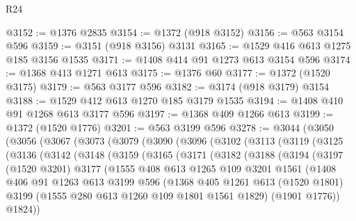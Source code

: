 \begin{lexlean}{R24}
\begin{coremodule}
@3152 := @1376 @2835
@3154 := @1372 (@918 @3152)
@3156 := @563 @3154 @596
@3159 := @3151 (@918 @3156) @3131
@3165 := @1529 @416 @613 @1275 @185 @3156 @1535
@3171 := @1408 @414 @91 @1273 @613 @3154 @596
@3174 := @1368 @413 @1271 @613
@3175 := @1376 @60
@3177 := @1372 (@1520 @3175)
@3179 := @563 @3177 @596
@3182 := @3174 (@918 @3179) @3154
@3188 := @1529 @412 @613 @1270 @185 @3179 @1535
@3194 := @1408 @410 @91 @1268 @613 @3177 @596
@3197 := @1368 @409 @1266 @613
@3199 := @1372 (@1520 @1776)
@3201 := @563 @3199 @596
@3278 := @3044
    (@3050
      (@3056
        (@3067
          (@3073
            (@3079
              (@3090
                (@3096
                  (@3102
                    (@3113
                      (@3119
                        (@3125
                          (@3136
                            (@3142
                              (@3148
                                (@3159
                                  (@3165
                                    (@3171
                                      (@3182
                                        (@3188
                                          (@3194
                                            (@3197
                                              (@1520 @3201)
                                              @3177
                                              (@1555
                                                @408
                                                @613
                                                @1265
                                                @109
                                                @3201
                                                @1561
                                                (@1408
                                                  @406
                                                  @91
                                                  @1263
                                                  @613
                                                  @3199
                                                  @596
                                                  (@1368
                                                    @405
                                                    @1261
                                                    @613
                                                    (@1520 @1801)
                                                    @3199
                                                    (@1555 @280 @613 @1260 @109 @1801 @1561 @1829)
                                                    (@1901 @1776))
                                                  @1824))

\end{coremodule}
\end{lexlean}
